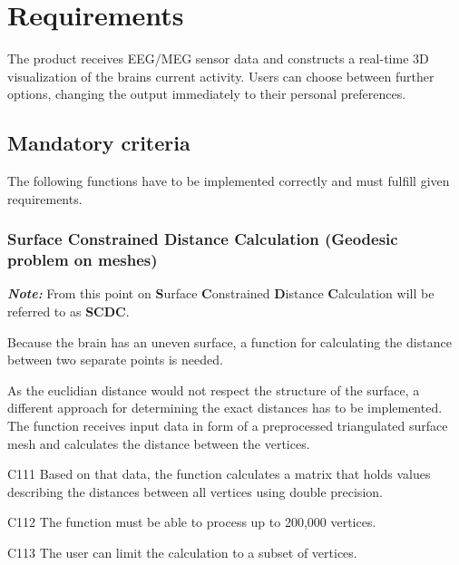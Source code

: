 \section{Requirements} 

	The product receives EEG/MEG sensor data and constructs a real-time 3D visualization of the brains current activity.
	Users can choose between further options, changing the output immediately to their personal preferences. 

\subsection{Mandatory criteria}

	The following functions have to be implemented correctly and must fulfill given requirements.
		
\subsubsection{Surface Constrained Distance Calculation (Geodesic problem on meshes)} \label{scdc}
	
	\begin{aims}
		
		\item[\textbf{\textit{Note:}}] From this point on \textbf{S}urface \textbf{C}onstrained \textbf{D}istance 
									   \textbf{C}alculation will be referred to as \textbf{SCDC}.
	
	\end{aims}
	
	Because the brain has an uneven surface, a function for calculating the distance between two separate points is needed.
	
	As the euclidian distance would not respect the structure of the surface, a different approach for determining the exact 	distances has to be implemented.  
	The function receives input data in form of a preprocessed triangulated surface mesh and calculates the distance between 	the vertices.			

	\begin{aims}
	
		\item[C111] Based on that data, the function calculates a matrix that holds values describing the distances between 						all vertices using double precision. 
		\item[C112] The function must be able to process up to 200,000 vertices.
		\item[C113] The user can limit the calculation to a subset of vertices. 
	
	\end{aims}

